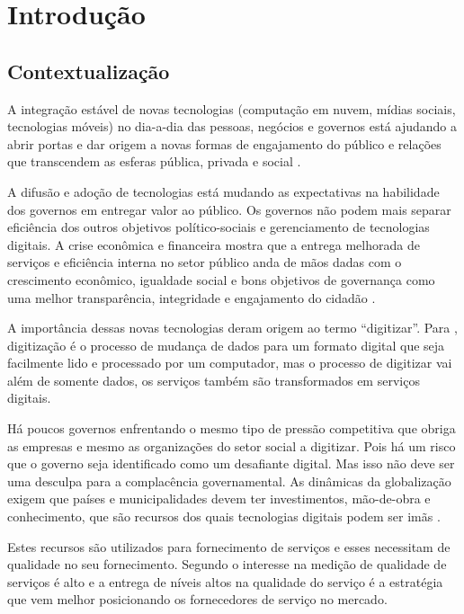 \chapter[Introdução]{Introdução}
\section{Contextualização}
A integração estável de novas tecnologias (computação em nuvem, mídias sociais, tecnologias móveis) no dia-a-dia das pessoas, negócios e governos está ajudando a abrir portas e dar origem a novas formas de engajamento do público  e relações que transcendem as esferas pública, privada e social \cite{oecd2014}.

A difusão e adoção de tecnologias está mudando as expectativas na habilidade dos governos em entregar valor ao público. Os governos não podem mais separar eficiência dos outros objetivos político-sociais e gerenciamento de tecnologias digitais. A crise econômica e financeira mostra que a entrega melhorada de serviços e eficiência interna no setor público anda de mãos dadas com o crescimento econômico, igualdade social e bons objetivos de governança como uma melhor transparência, integridade e engajamento do cidadão \cite{oecd2014}.

A importância dessas novas tecnologias deram origem ao termo “digitizar”. Para \cite{steven2015}, digitização é o processo de mudança de dados para um formato digital que seja facilmente lido e processado por um computador, mas o processo de digitizar vai além de somente dados, os serviços também são transformados em serviços digitais.

Há poucos governos enfrentando o mesmo tipo de pressão competitiva que obriga as empresas e mesmo as organizações do setor social a digitizar. Pois há um risco que o governo seja identificado como um desafiante digital. Mas isso não deve ser uma desculpa para a complacência governamental. As dinâmicas da globalização exigem que países e municipalidades devem ter investimentos, mão-de-obra e conhecimento, que são recursos dos quais tecnologias digitais podem ser imãs \cite{mckinsey2016}.

Estes recursos são utilizados para fornecimento de serviços e esses necessitam de qualidade no seu fornecimento. Segundo \cite{cronintaylor1992} o interesse na medição de qualidade de serviços é alto e a entrega de níveis altos na qualidade do serviço é a estratégia que vem melhor posicionando os fornecedores de serviço no mercado. 

